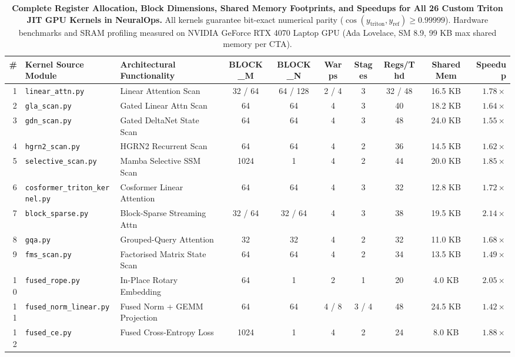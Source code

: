 \begin{table}[p]
\centering
\caption{\textbf{Complete Register Allocation, Block Dimensions, Shared Memory Footprints, and Speedups for All 26 Custom Triton JIT GPU Kernels in NeuralOps.}
All kernels guarantee bit-exact numerical parity ($\cos(y_{\text{triton}}, y_{\text{ref}}) \ge 0.99999$). Hardware benchmarks and SRAM profiling measured on NVIDIA GeForce RTX 4070 Laptop GPU (Ada Lovelace, SM 8.9, 99 KB max shared memory per CTA).}
\label{tab:triton_kernels}
\scriptsize
\setlength{\tabcolsep}{2.5pt}
\begin{tabular}{rllccccccr}
\toprule
\textbf{\#} & \textbf{Kernel Source Module} & \textbf{Architectural Functionality} & \textbf{BLOCK\_M} & \textbf{BLOCK\_N} & \textbf{Warps} & \textbf{Stages} & \textbf{Regs/Thd} & \textbf{Shared Mem} & \textbf{Speedup} \\
\midrule
1 & \texttt{linear\_attn.py} & Linear Attention Scan & 32 / 64 & 64 / 128 & 2 / 4 & 3 & 32 / 48 & 16.5 KB & $1.78\times$ \\
2 & \texttt{gla\_scan.py} & Gated Linear Attn Scan & 64 & 64 & 4 & 3 & 40 & 18.2 KB & $1.64\times$ \\
3 & \texttt{gdn\_scan.py} & Gated DeltaNet State Scan & 64 & 64 & 4 & 3 & 48 & 24.0 KB & $1.55\times$ \\
4 & \texttt{hgrn2\_scan.py} & HGRN2 Recurrent Scan & 64 & 64 & 4 & 2 & 36 & 14.5 KB & $1.62\times$ \\
5 & \texttt{selective\_scan.py} & Mamba Selective SSM Scan & 1024 & 1 & 4 & 2 & 44 & 20.0 KB & $1.85\times$ \\
6 & \texttt{cosformer\_triton\_kernel.py} & Cosformer Linear Attention & 64 & 64 & 4 & 3 & 32 & 12.8 KB & $1.72\times$ \\
7 & \texttt{block\_sparse.py} & Block-Sparse Streaming Attn & 32 / 64 & 32 / 64 & 4 & 3 & 38 & 19.5 KB & $\mathbf{2.14\times}$ \\
8 & \texttt{gqa.py} & Grouped-Query Attention & 32 & 32 & 4 & 2 & 32 & 11.0 KB & $1.68\times$ \\
9 & \texttt{fms\_scan.py} & Factorised Matrix State Scan & 64 & 64 & 4 & 2 & 34 & 13.5 KB & $1.49\times$ \\
10 & \texttt{fused\_rope.py} & In-Place Rotary Embedding & 64 & 1 & 2 & 1 & 20 & 4.0 KB & $2.05\times$ \\
11 & \texttt{fused\_norm\_linear.py} & Fused Norm + GEMM Projection & 64 & 64 & 4 / 8 & 3 / 4 & 48 & 24.5 KB & $1.42\times$ \\
12 & \texttt{fused\_ce.py} & Fused Cross-Entropy Loss & 1024 & 1 & 4 & 2 & 24 & 8.0 KB & $1.88\times$ \\

\end{tabular}
\end{table}
